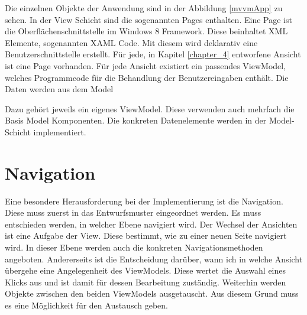 Die einzelnen Objekte der Anwendung sind in der Abbildung \ref{mvvmApp} zu sehen. In der View Schicht sind die sogenannten Pages enthalten. Eine Page ist die Oberflächenschnittstelle im Windows 8 Framework.  Diese beinhaltet XML Elemente, sogenannten XAML Code. Mit diesem wird deklarativ eine Benutzerschnittstelle erstellt. Für jede, in Kapitel \ref{chapter_4} entworfene Ansicht ist eine Page vorhanden. Für jede Ansicht existiert ein passendes ViewModel, welches Programmcode für die Behandlung der Benutzereingaben enthält. Die Daten werden aus dem Model

Dazu gehört jeweils ein eigenes ViewModel.  Diese verwenden auch mehrfach die Basis Model Komponenten. Die konkreten Datenelemente werden in der Model-Schicht implementiert. 


\section{Navigation}
Eine besondere Herausforderung bei der Implementierung ist die Navigation. Diese muss zuerst in das Entwurfsmuster eingeordnet werden. Es muss entschieden werden, in welcher Ebene navigiert wird. Der Wechsel der Ansichten ist eine Aufgabe der View. Diese bestimmt, wie zu einer neuen Seite navigiert wird. In dieser Ebene werden auch die konkreten Navigationsmethoden angeboten. Andererseits ist die Entscheidung darüber, wann ich in welche Ansicht übergehe eine Angelegenheit des ViewModels. Diese wertet die Auswahl eines Klicks aus und ist damit für dessen Bearbeitung zuständig. Weiterhin werden Objekte zwischen den beiden ViewModels ausgetauscht. Aus diesem Grund muss es eine Möglichkeit für den Austausch geben. \par 

